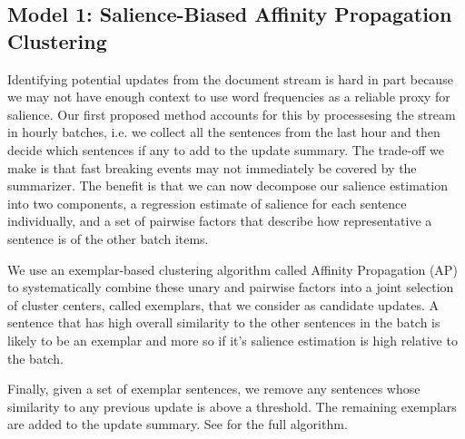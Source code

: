 \subsection{Model 1: Salience-Biased Affinity Propagation Clustering}  
\label{sec:sapmodel}


%  

  Identifying potential updates from the document stream is hard in part
  because we may not have enough context to use word frequencies as a 
  reliable proxy for salience. 
  Our first proposed method accounts for this
  by
  processesing the stream in hourly batches, i.e. we collect all the
  sentences from the last hour and then decide which sentences if any to
  add to the update summary. The trade-off we make is that fast breaking
  events may not immediately be covered by the summarizer. The benefit
  is that we can now decompose our salience estimation into two components,
  a regression estimate of salience for each sentence individually,
  and a set of pairwise factors that describe how representative a sentence 
  is of the other batch items. 


%   

  We use an exemplar-based clustering algorithm
  called Affinity Propagation (AP) \citep{frey2007clustering}
  to systematically combine these unary and pairwise factors into a joint 
  selection of cluster centers, called exemplars, that we consider as 
  candidate updates.
  A sentence that has high overall similarity to
  the other sentences in the batch is likely to be an exemplar and
  more so if it's salience estimation is high relative to the batch.



  
  
  Finally, given a set of exemplar sentences, we remove any
  sentences whose similarity to any previous update is above a threshold.
  The remaining exemplars are added to the update summary.
  See \cite{kedzie2015predicting} for the full algorithm.



